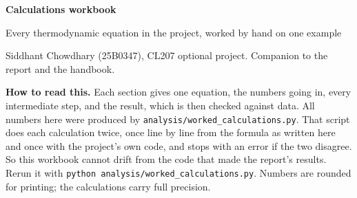 \documentclass[11pt,a4paper]{article}
\newcommand{\file}[1]{\texttt{\small #1}}
\begin{document}
{\LARGE\bfseries\color{acc} Calculations workbook}\par\vspace{2pt}
{\large Every thermodynamic equation in the project, worked by hand on one example}\par\vspace{4pt}
{\small\color{mid} Siddhant Chowdhary (25B0347), CL207 optional project. Companion to the report and the handbook.}\par
\vspace{6pt}

\begin{result}
\textbf{How to read this.} Each section gives one equation, the numbers going in, every intermediate step, and the result,
which is then checked against data. All numbers here were produced by \file{analysis/worked\_calculations.py}. That script
does each calculation twice, once line by line from the formula as written here and once with the project's own code,
and stops with an error if the two disagree. So this workbook cannot drift from the code that made the report's results.
Rerun it with \file{python analysis/worked\_calculations.py}.
Numbers are rounded for printing; the calculations carry full precision.
\end{result}
\end{document}

